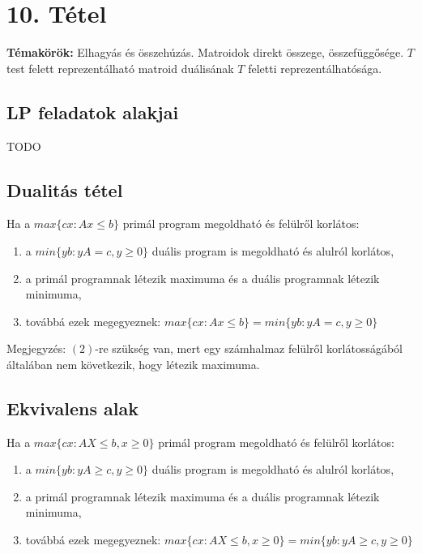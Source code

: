 
\setcounter{chapter}{10}
\chapter*{10. Tétel}

\textbf{Témakörök:} Elhagyás és összehúzás. Matroidok direkt összege, összefüggősége. $T$ test felett reprezentálható matroid duálisának $T$ feletti reprezentálhatósága.

\noindent\hrulefill

\section*{LP feladatok alakjai}

\begin{theo} TODO \end{theo}

\section*{Dualitás tétel}

\begin{theo} 
Ha a $max \lbrace c x: Ax\leq b\rbrace$ primál program megoldható és felülről korlátos:
\begin{enumerate}
\item	a $min \lbrace yb: yA=c,y\geq 0\rbrace$ duális program is megoldható és alulról korlátos,
\item	a primál programnak létezik maximuma és a duális programnak létezik minimuma,
\item	továbbá ezek megegyeznek: $max\lbrace cx: Ax\leq b\rbrace = min\lbrace yb: yA=c,y\geq 0\rbrace$
\end{enumerate}
\end{theo}
Megjegyzés: $(2)$-re szükség van, mert egy számhalmaz felülről korlátosságából általában nem következik, hogy létezik maximuma.

\section*{Ekvivalens alak}
\begin{theo}
Ha a $max\lbrace cx:AX\leq b,x\geq 0\rbrace$ primál program megoldható és felülről korlátos:
\begin{enumerate}
\item a $min \lbrace yb:yA\geq c, y \geq 0\rbrace$ duális program is megoldható és alulról korlátos,
\item	a primál programnak létezik maximuma és a duális programnak létezik minimuma,
\item	továbbá ezek megegyeznek: $max\lbrace cx:AX\leq b,x\geq 0\rbrace = min \lbrace yb:yA\geq c, y \geq 0\rbrace$
\end{enumerate}
\end{theo}

